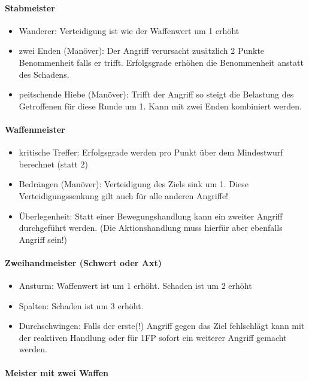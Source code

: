 \documentclass{article}
\begin{document}
\paragraph{Stabmeister}

\begin{itemize}
\item Wanderer: Verteidigung ist wie der Waffenwert um 1 erhöht
\item zwei Enden (Manöver): Der Angriff verursacht zusätzlich 2 Punkte Benommenheit falls er trifft. Erfolgsgrade erhöhen die Benommenheit anstatt des Schadens.
\item peitschende Hiebe (Manöver): Trifft der Angriff so steigt die Belastung des Getroffenen für diese Runde um 1. Kann mit zwei Enden kombiniert werden.
\end{itemize}

\paragraph{Waffenmeister}

\begin{itemize}
\item kritische Treffer: Erfolgsgrade werden pro Punkt über dem Mindestwurf berechnet (statt 2)
\item Bedrängen (Manöver): Verteidigung des Ziels sink um 1. Diese Verteidigungssenkung gilt auch für alle anderen Angriffe!
\item Überlegenheit: Statt einer Bewegungshandlung kann ein zweiter Angriff durchgeführt werden. (Die Aktionshandlung muss hierfür aber ebenfalls Angriff sein!)
\end{itemize}

\paragraph{Zweihandmeister (Schwert oder Axt)}

\begin{itemize}
\item Ansturm: Waffenwert ist um 1 erhöht. Schaden ist um 2 erhöht
\item Spalten: Schaden ist um 3 erhöht.
\item Durchschwingen: Falls der erste(!) Angriff gegen das Ziel fehlschlägt kann mit der reaktiven Handlung oder für 1FP sofort ein weiterer Angriff gemacht werden.
\end{itemize}

\paragraph{Meister mit zwei Waffen}
\end{document}

